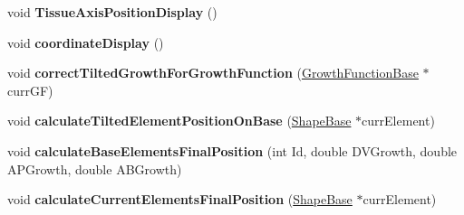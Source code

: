 \begin{DoxyCompactItemize}
\item 
\hypertarget{classSimulation_abb87948e7b8131fd5d747bf728232db2}{}void {\bfseries Tissue\+Axis\+Position\+Display} ()\label{classSimulation_abb87948e7b8131fd5d747bf728232db2}

\item 
\hypertarget{classSimulation_a1d49a9ab3e83456d86ec5bfcf0d1a804}{}void {\bfseries coordinate\+Display} ()\label{classSimulation_a1d49a9ab3e83456d86ec5bfcf0d1a804}

\item 
\hypertarget{classSimulation_a3b25df63c54a058e6917309aed483e6e}{}void {\bfseries correct\+Tilted\+Growth\+For\+Growth\+Function} (\hyperlink{classGrowthFunctionBase}{Growth\+Function\+Base} $\ast$curr\+G\+F)\label{classSimulation_a3b25df63c54a058e6917309aed483e6e}

\item 
\hypertarget{classSimulation_acbe2603b1eb8b50978f9f1d30f87311c}{}void {\bfseries calculate\+Tilted\+Element\+Position\+On\+Base} (\hyperlink{classShapeBase}{Shape\+Base} $\ast$curr\+Element)\label{classSimulation_acbe2603b1eb8b50978f9f1d30f87311c}

\item 
\hypertarget{classSimulation_aa6e3525243aaf17afe95dc5bd97a124a}{}void {\bfseries calculate\+Base\+Elements\+Final\+Position} (int Id, double D\+V\+Growth, double A\+P\+Growth, double A\+B\+Growth)\label{classSimulation_aa6e3525243aaf17afe95dc5bd97a124a}

\item 
\hypertarget{classSimulation_af6f6e9ee39d12e91957d934a2f1711f9}{}void {\bfseries calculate\+Current\+Elements\+Final\+Position} (\hyperlink{classShapeBase}{Shape\+Base} $\ast$curr\+Element)\label{classSimulation_af6f6e9ee39d12e91957d934a2f1711f9}

\end{DoxyCompactItemize}
